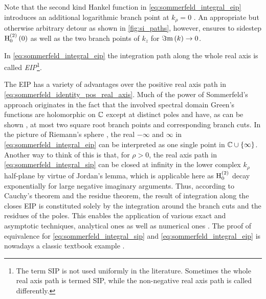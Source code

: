 Note that the second kind Hankel function in \eqref{eq:sommerfeld_integral_eip}
introduces an additional logarithmic branch point at $k_\rho = 0$
\cite{Olver2010}.
An appropriate but otherwise arbitrary detour as shown in \cref{fig:si_paths},
however, ensures to sidestep $\besselh{2}{0} \left(0\right)$ as well as the
two branch points of $k_z$ for $\imag{k} \to 0$.
	
\begin{definition}
	In \eqref{eq:sommerfeld_integral_eip} the integration path along the whole
	real axis is called \emph{\ac{EIP}}\footnote{
	The term \acl{SIP} is not used uniformly in the literature.
	Sometimes the whole real axis path is termed \ac{SIP}, while the
	non-negative real axis path is called differently.
	}.
\end{definition}

The \ac{EIP} has a variety of advantages over the positive real axis path in
\eqref{eq:sommerfeld_identity_pos_real_axis}.
Much of the power of Sommerfeld's approach originates in the fact that the
involved spectral domain Green's functions are holomorphic on $\C$ except at 
distinct poles and have, as can be shown \cite{Michalski2016b}, at most two
square root branch points and corresponding branch cuts.
In the picture of Riemann's sphere \cite[180]{Meyberg2006}, the real
$-\infty$ and $\infty$ in \eqref{eq:sommerfeld_integral_eip} can be interpreted
as one single point in $\C \cup \left\{\infty\right\}$.
Another way to think of this is that, for $\rho > 0$, the real axis path in
\eqref{eq:sommerfeld_integral_sip} can be closed at infinity in the lower
complex $k_\rho$ half-plane by virtue of Jordan's lemma, which is applicable
here as $\besselh{2}{0}$ decay exponentially for large negative imaginary
arguments.
Thus, according to Cauchy's theorem and the residue theorem, the result of
integration along the closes \ac{EIP} is constituted solely by the integration
around the branch cuts and the residues of the poles.
This enables the application of various exact and asymptotic techniques,
analytical ones as well as numerical ones
\cite{Sommerfeld1964,Chew1999,Michalski1985a,Michalski2016b}.
The proof of equivalence for \eqref{eq:sommerfeld_integral_sip} and
\eqref{eq:sommerfeld_integral_eip} is nowadays a classic textbook example
\cite[203]{Sommerfeld1964}.

